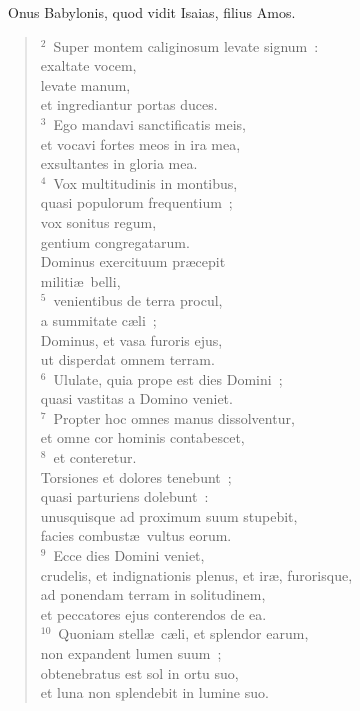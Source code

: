 ~Onus Babylonis, quod vidit Isaias, filius Amos.
\begin{flushleft}\begin{verse}\vspace{6pt}${}^{2}$~Super montem caliginosum levate signum~:\\ exaltate vocem,\\ levate manum,\\ et ingrediantur portas duces.\\
${}^{3}$~Ego mandavi sanctificatis meis,\\ et vocavi fortes meos in ira mea,\\ exsultantes in gloria mea.\\
${}^{4}$~Vox multitudinis in montibus,\\ quasi populorum frequentium~;\\ vox sonitus regum,\\ gentium congregatarum.\\ Dominus exercituum pr\ae cepit\\ militi\ae\ belli,\\
${}^{5}$~venientibus de terra procul,\\ a summitate c\ae li~;\\ Dominus, et vasa furoris ejus,\\ ut disperdat omnem terram.\\
${}^{6}$~Ululate, quia prope est dies Domini~;\\ quasi vastitas a Domino veniet.\\
${}^{7}$~Propter hoc omnes manus dissolventur,\\ et omne cor hominis contabescet,\\
${}^{8}$~et conteretur.\\ Torsiones et dolores tenebunt~;\\ quasi parturiens dolebunt~:\\ unusquisque ad proximum suum stupebit,\\ facies combust\ae\ vultus eorum.\\
${}^{9}$~Ecce dies Domini veniet,\\ crudelis, et indignationis plenus, et ir\ae , furorisque,\\ ad ponendam terram in solitudinem,\\ et peccatores ejus conterendos de ea.\\
${}^{10}$~Quoniam stell\ae\ c\ae li, et splendor earum,\\ non expandent lumen suum~;\\ obtenebratus est sol in ortu suo,\\ et luna non splendebit in lumine suo.\\

\end{verse}
\end{flushleft}

